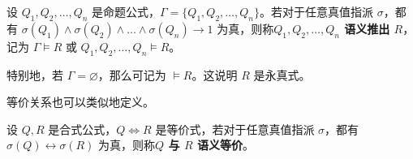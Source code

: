 \begin{definition}
    设 $Q_1, Q_2, \dots, Q_n$ 是命题公式，$\Gamma = \{Q_1, Q_2, \dots, Q_n\}$。若对于任意真值指派 $\sigma$，都有 $\sigma(Q_1) \land \sigma(Q_2) \land \dots \land \sigma(Q_n) \to 1$ 为真，则称\textbf{$Q_1, Q_2, \dots, Q_n$ 语义推出 $R$}，记为 $\Gamma \models R$ 或 $Q_1, Q_2, \dots, Q_n \models R$。

    特别地，若 $\Gamma = \varnothing$，那么可记为 $\models R$。这说明 $R$ 是永真式。
\end{definition}

等价关系也可以类似地定义。

\begin{definition}
    设 $Q, R$ 是合式公式，$Q \iff R$ 是等价式，若对于任意真值指派 $\sigma$，都有 $\sigma(Q) \leftrightarrow \sigma(R)$ 为真，则称\textbf{$Q$ 与 $R$ 语义等价}。
\end{definition}

